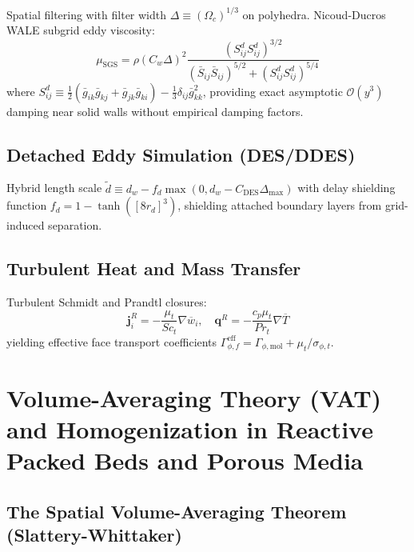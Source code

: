 \documentclass[11pt,a4paper]{article}
\begin{document}
Spatial filtering with filter width $\Delta \equiv (\Omega_c)^{1/3}$ on polyhedra. Nicoud-Ducros WALE subgrid eddy viscosity:
\begin{equation}
\mu_{\text{SGS}} = \rho (C_w \Delta)^2 \frac{\left( S_{ij}^d S_{ij}^d \right)^{3/2}}{\left( \bar{S}_{ij} \bar{S}_{ij} \right)^{5/2} + \left( S_{ij}^d S_{ij}^d \right)^{5/4}}
\end{equation}
where $S_{ij}^d \equiv \frac{1}{2}(\bar{g}_{ik}\bar{g}_{kj} + \bar{g}_{jk}\bar{g}_{ki}) - \frac{1}{3}\delta_{ij}\bar{g}_{kk}^2$, providing exact asymptotic $\mathcal{O}(y^3)$ damping near solid walls without empirical damping factors.

\subsection{Detached Eddy Simulation (DES/DDES)}
\label{subsec:ddes}

Hybrid length scale $\tilde{d} \equiv d_w - f_d \max(0, d_w - C_{\text{DES}} \Delta_{\text{max}})$ with delay shielding function $f_d = 1 - \tanh([8 r_d]^3)$, shielding attached boundary layers from grid-induced separation.

\subsection{Turbulent Heat and Mass Transfer}
\label{subsec:turbulent-scalar-transport}

Turbulent Schmidt and Prandtl closures:
\begin{equation}
\mathbf{j}_i^R = -\frac{\mu_t}{Sc_t} \nabla \overline{w}_i, \quad \mathbf{q}^R = -\frac{c_p \mu_t}{Pr_t} \nabla \overline{T}
\end{equation}
yielding effective face transport coefficients $\Gamma_{\phi, f}^{\text{eff}} = \Gamma_{\phi, \text{mol}} + \mu_t / \sigma_{\phi, t}$.


\section{Volume-Averaging Theory (VAT) and Homogenization in Reactive Packed Beds and Porous Media}
\label{sec:volume-averaging-theory}

\subsection{The Spatial Volume-Averaging Theorem (Slattery-Whittaker)}
\label{subsec:slattery-whittaker}
\end{document}
